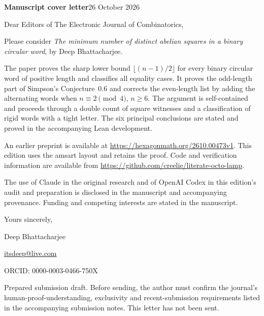 \documentclass[11pt]{article}
\begin{document}
{\large\bfseries Manuscript cover letter}\hfill 26 October 2026

Dear Editors of The Electronic Journal of Combinatorics,

Please consider \emph{The minimum number of distinct abelian squares in a binary circular word}, by Deep Bhattacharjee.

The paper proves the sharp lower bound $\lfloor(n-1)/2\rfloor$ for every binary circular word of positive length and classifies all equality cases. It proves the odd-length part of Simpson's Conjecture~0.6 and corrects the even-length list by adding the alternating words when $n\equiv2\pmod4$, $n\ge6$. The argument is self-contained and proceeds through a double count of square witnesses and a classification of rigid words with a tight letter. The six principal conclusions are stated and proved in the accompanying Lean development.

An earlier preprint is available at \url{https://hexagonmath.org/2610.00473v1}. This edition uses the amsart layout and retains the proof. Code and verification information are available from \url{https://github.com/creelie/literate-octo-lamp}.

The use of Claude in the original research and of OpenAI Codex in this edition's audit and preparation is disclosed in the manuscript and accompanying provenance. Funding and competing interests are stated in the manuscript.

Yours sincerely,\par
Deep Bhattacharjee\par
\href{mailto:itsdeep@live.com}{itsdeep@live.com}\par
ORCID: 0000-0003-0466-750X

\vfill
{\footnotesize Prepared submission draft. Before sending, the author must confirm the journal's human-proof-understanding, exclusivity and recent-submission requirements listed in the accompanying submission notes. This letter has not been sent.}
\end{document}
